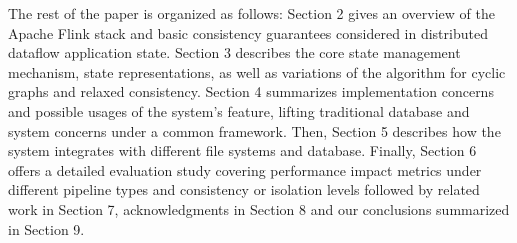 The rest of the paper is organized as follows: Section 2 gives an overview of the Apache Flink stack and basic consistency guarantees considered in distributed dataflow application state. Section 3 describes the core state management mechanism, state representations, as well as variations of the algorithm for cyclic graphs and relaxed consistency. Section 4 summarizes implementation concerns and possible usages of the system's feature, lifting traditional database and system concerns under a common framework. Then, Section 5 describes how the system integrates with different file systems and database. Finally, Section 6 offers a detailed evaluation study covering performance impact metrics under different pipeline types and consistency or isolation levels followed by related work in Section 7, acknowledgments in Section 8 and our conclusions summarized in Section 9.
